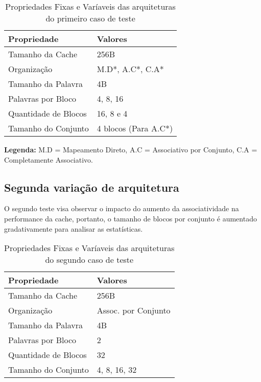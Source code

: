 \documentclass[conference]{IEEEtran}
\begin{document}
\begin{table}[htb]
\centering
\begin{tabular}{|l|l|}
\hline
\textbf{Propriedade}       & \textbf{Valores}         \\ \hline
Tamanho da Cache           & 256B                    \\ \hline
Organização                & M.D*, A.C*, C.A*        \\ \hline
Tamanho da Palavra         & 4B                  \\ \hline
Palavras por Bloco         & 4, 8, 16                \\ \hline
Quantidade de Blocos       & 16, 8 e 4           \\ \hline
Tamanho do Conjunto        & 4 blocos (Para A.C*)    \\ \hline
\end{tabular}
\caption{Propriedades Fixas e Varíaveis das arquiteturas do primeiro caso de teste}
\label{tab:propriedades}
\vspace{0.5cm}
\footnotesize
\textbf{Legenda:} M.D = Mapeamento Direto, A.C = Associativo por Conjunto, C.A = Completamente Associativo.
\end{table}

\subsection{Segunda variação de arquitetura}
O segundo teste visa observar o impacto do aumento da associatividade na performance da cache, portanto, o tamanho de blocos por conjunto é aumentado gradativamente para analisar as estatísticas.

\begin{table}[htb]
\centering
\begin{tabular}{|l|l|}
\hline
\textbf{Propriedade}       & \textbf{Valores}         \\ \hline
Tamanho da Cache           & 256B                    \\ \hline
Organização                & Assoc. por Conjunto        \\ \hline
Tamanho da Palavra         & 4B                  \\ \hline
Palavras por Bloco         & 2                \\ \hline
Quantidade de Blocos       & 32          \\ \hline
Tamanho do Conjunto        & 4, 8, 16, 32    \\ \hline
\end{tabular}
\caption{Propriedades Fixas e Varíaveis das arquiteturas do segundo caso de teste}
\label{tab:propriedades}
\vspace{0,5 cm}
\end{table}
\end{document}
